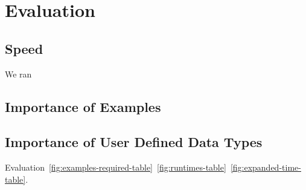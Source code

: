 \section{Evaluation}


\subsection{Speed}
We ran 


\subsection{Importance of Examples}


\subsection{Importance of User Defined Data Types}

Evaluation~\ref{fig:examples-required-table}~\ref{fig:runtimes-table}~\ref{fig:expanded-time-table}.

